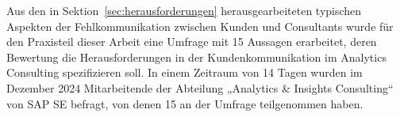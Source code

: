 \documentclass[../main.tex]{subfiles}
\begin{document}
Aus den in Sektion~\ref{sec:herausforderungen} herausgearbeiteten typischen Aspekten der Fehlkommunikation zwischen Kunden und Consultants wurde für den Praxisteil dieser Arbeit eine Umfrage mit 15 Aussagen erarbeitet, deren Bewertung die Herausforderungen in der Kundenkommunikation im Analytics Consulting spezifizieren soll.
In einem Zeitraum von 14 Tagen wurden im Dezember 2024 Mitarbeitende der Abteilung „Analytics \& Insights Consulting“ von SAP SE befragt, von denen 15 an der Umfrage teilgenommen haben.
\end{document}
